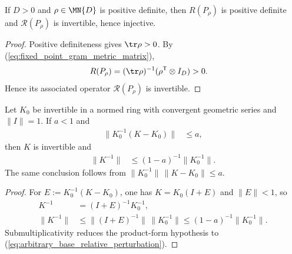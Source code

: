 \begin{lemma}
    \label{thm:fixed_point_gram_metric_is_unit}
    \leanok
    If $D>0$ and $\rho\in\MN{D}$ is positive definite, then
    $R(P_\rho)$ is positive definite and $\mathscr R(P_\rho)$ is invertible,
    hence injective.
\end{lemma}

\begin{proof}
    \leanok
    Positive definiteness gives $\tr\rho>0$.  By
    (\ref{eq:fixed_point_gram_metric_matrix}),
    \begin{align}
        R(P_\rho)
         & =(\tr\rho)^{-1}(\rho^{\mathsf T}\otimes I_D)>0.
    \end{align}
    Hence its associated operator $\mathscr R(P_\rho)$ is invertible.
\end{proof}

\begin{lemma}
    \label{thm:arbitrary_base_neumann_inverse_bound}
    \leanok
    Let $K_0$ be invertible in a normed ring with convergent geometric series
    and $\lVert I\rVert=1$.  If $a<1$ and
    \begin{align}
        \lVert K_0^{-1}(K-K_0)\rVert & \le a,
        \label{eq:arbitrary_base_relative_perturbation}
    \end{align}
    then $K$ is invertible and
    \begin{align}
        \lVert K^{-1}\rVert
         & \le(1-a)^{-1}\lVert K_0^{-1}\rVert.
        \label{eq:arbitrary_base_inverse_bound}
    \end{align}
    The same conclusion follows from
    $\lVert K_0^{-1}\rVert\,\lVert K-K_0\rVert\le a$.
\end{lemma}

\begin{proof}
    \leanok
    For $E:=K_0^{-1}(K-K_0)$, one has
    $K=K_0(I+E)$ and $\lVert E\rVert<1$, so
    \begin{align}
        K^{-1} & =(I+E)^{-1}K_0^{-1},                             \\
        \lVert K^{-1}\rVert
               & \le\lVert(I+E)^{-1}\rVert\,\lVert K_0^{-1}\rVert
        \le(1-a)^{-1}\lVert K_0^{-1}\rVert.
    \end{align}
    Submultiplicativity reduces the product-form hypothesis to
    (\ref{eq:arbitrary_base_relative_perturbation}).
\end{proof}

